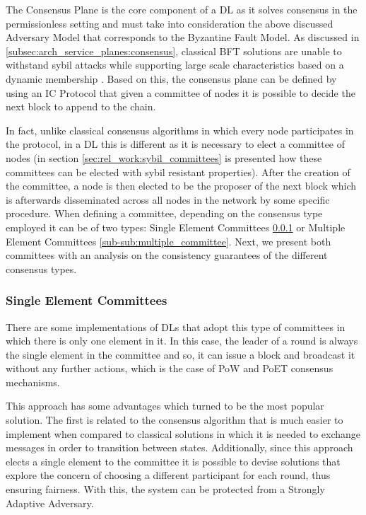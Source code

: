 The Consensus Plane is the core component of a \gls{DL} as it solves consensus in the permissionless setting and must take into consideration the above discussed Adversary Model that corresponds to the Byzantine Fault Model. As discussed in \ref{subsec:arch_service_planes:consensus}, classical \gls{BFT} solutions are unable to withstand sybil attacks while supporting large scale characteristics based on a dynamic membership \cite{sybil_attack}. Based on this, the consensus plane can be defined by using an \gls{IC} Protocol that given a committee of nodes it is possible to decide the next block to append to the chain.

In fact, unlike classical consensus algorithms in which every node participates in the protocol, in a \gls{DL} this is different as it is necessary to elect a committee of nodes (in section \ref{sec:rel_work:sybil_committees} is presented how these committees can be elected with sybil resistant properties). After the creation of the committee, a node is then elected to be the proposer of the next block which is afterwards disseminated across all nodes in the network by some specific procedure. When defining a committee, depending on the consensus type employed it can be of two types: Single Element Committees \ref{sub-sub:single_committee} or Multiple Element Committees \ref{sub-sub:multiple_committee}. Next, we present both committees with an analysis on the consistency guarantees of the different consensus types.

\subsubsection{Single Element Committees}
\label{sub-sub:single_committee}

There are some implementations of \gls{DL}s \cite{bitcoin, bitcoin-ng} that adopt this type of committees in which there is only one element in it. In this case, the leader of a round is always the single element in the committee and so, it can issue a block and broadcast it without any further actions, which is the case of \gls{PoW} and \gls{PoET} consensus mechanisms.

This approach has some advantages which turned to be the most popular solution. The first is related to the consensus algorithm that is much easier to implement when compared to classical solutions in which it is needed to exchange messages in order to transition between states. Additionally, since this approach elects a single element to the committee it is possible to devise solutions that explore the concern of choosing a different participant for each round, thus ensuring fairness. With this, the system can be protected from a Strongly Adaptive Adversary.

